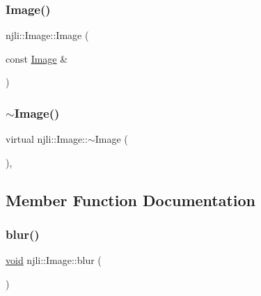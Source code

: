 \mbox{\label{classnjli_1_1_image_a70b449b0a21208c1da192eaa069f49f9}} 
\subsubsection{\texorpdfstring{Image()}{Image()}\hspace{0.1cm}{\footnotesize\ttfamily [3/3]}}
{\footnotesize\ttfamily njli\+::\+Image\+::\+Image (\begin{DoxyParamCaption}\item[{const \mbox{\hyperlink{classnjli_1_1_image}{Image}} \&}]{ }\end{DoxyParamCaption})\hspace{0.3cm}{\ttfamily [protected]}}

\mbox{\label{classnjli_1_1_image_a53e6a2614b1db0ccb9ca56115c4b4217}} 
\subsubsection{\texorpdfstring{$\sim$\+Image()}{~Image()}}
{\footnotesize\ttfamily virtual njli\+::\+Image\+::$\sim$\+Image (\begin{DoxyParamCaption}{ }\end{DoxyParamCaption})\hspace{0.3cm}{\ttfamily [protected]}, {\ttfamily [virtual]}}



\subsection{Member Function Documentation}
\mbox{\label{classnjli_1_1_image_af0f769d7188c8493a97d3a12c266f1d2}} 
\subsubsection{\texorpdfstring{blur()}{blur()}}
{\footnotesize\ttfamily \mbox{\hyperlink{_thread_8h_af1e856da2e658414cb2456cb6f7ebc66}{void}} njli\+::\+Image\+::blur (\begin{DoxyParamCaption}{ }\end{DoxyParamCaption})}

